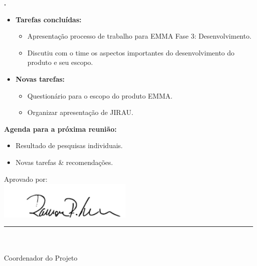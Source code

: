 	
   \textbf{\julia.} 
	\begin{itemize}
		\item \textbf{Tarefas concluídas:}
			\begin{itemize}    
				\item Apresentação processo de trabalho para EMMA Fase 3: Desenvolvimento.
				\item Discutiu com o time os aspectos importantes do desenvolvimento do
				produto e seu escopo. 
			\end{itemize}
		
		\item \textbf{Novas tarefas:}
			\begin{itemize} 
			    \item Questionário para o escopo do produto EMMA.
			    \item Organizar apresentação de JIRAU.
			\end{itemize}
	\end{itemize}		



\textbf{Agenda para a próxima reunião:}
  \begin{itemize}
    \item Resultado de pesquisas individuais.
    \item Novas tarefas \& recomendações.
  \end{itemize}


\vspace{5mm}%
\parbox[t]{70mm}{
  Aprovado por: \\[5mm]
  \centering
  \includegraphics[width=65mm]{figs/logo/assinatura-ramon.png} \\[-4mm]
  \rule[2mm]{70mm}{0.1mm} \\
  \ramon \\[1mm]
  Coordenador do Projeto \\
}

\fim